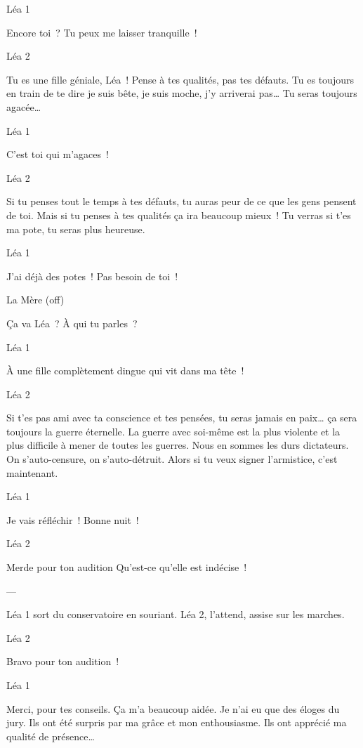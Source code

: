 \documentclass{frscenario}
\begin{document}
\— Léa 1

Encore toi ? Tu peux me laisser tranquille !

\— Léa 2

Tu es une fille géniale, Léa ! Pense à tes qualités, pas tes défauts. Tu es toujours en train de te dire
je suis bête, je suis moche, j’y arriverai pas… Tu seras toujours agacée…

\— Léa 1

C’est toi qui m’agaces !

\— Léa 2

Si tu penses tout le temps à tes défauts, tu auras peur de ce que les gens pensent de toi. Mais si tu penses à tes qualités ça ira beaucoup mieux ! Tu verras si t’es ma pote, tu seras plus heureuse.

\— Léa 1

J’ai déjà des potes ! Pas besoin de toi !

\— La Mère (off)

Ça va Léa ? À qui tu parles ?

\— Léa 1

À une fille complètement dingue qui vit dans ma tête !

\— Léa 2

Si t’es pas ami avec ta conscience et tes pensées, tu seras jamais en paix… ça sera toujours la guerre éternelle. La guerre avec soi-même est la plus violente et la plus difficile à mener de toutes les guerres. Nous en sommes les durs dictateurs. On s’auto-censure, on s’auto-détruit. Alors si tu veux signer l’armistice, c’est maintenant.

\— Léa 1

Je vais réfléchir ! Bonne nuit !

\— Léa 2

Merde pour ton audition
Qu’est-ce qu’elle est indécise !

\——


Léa 1 sort du conservatoire en souriant. Léa 2, l’attend, assise sur les marches.

\— Léa 2

Bravo pour ton audition !

\— Léa 1

Merci, pour tes conseils. Ça m’a beaucoup aidée. Je n’ai eu que des éloges du jury. Ils ont été surpris par ma grâce et mon enthousiasme. Ils ont apprécié ma qualité de présence…
\end{document}
